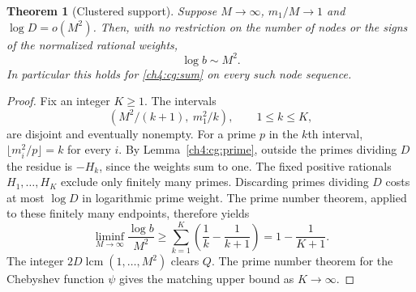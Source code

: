 \documentclass[11pt,a4paper,oneside,openany]{report}
\newtheorem{theorem}{Theorem}[section]
\theoremstyle{remark}\newtheorem{remark}[theorem]{Remark}
\numberwithin{equation}{section}
\begin{document}
\begin{theorem}[Clustered support]\label{ch4:cg:cluster}
Suppose $M\to\infty$, $m_1/M\to1$ and $\log D=o(M^2)$.
Then, with no restriction on the number of nodes or the signs of
the normalized rational weights,
\[
                          \log b\sim M^2 .
\]
In particular this holds for \eqref{ch4:cg:sum} on every such node sequence.
\end{theorem}
\begin{proof}
Fix an integer $K\ge1$. The intervals
\[
           \left(M^2/(k+1),\ m_1^2/k\right),\qquad 1\le k\le K,
\]
are disjoint and eventually nonempty. For a prime $p$ in the $k$th
interval, $\lfloor m_i^2/p\rfloor=k$ for every $i$.
By Lemma~\ref{ch4:cg:prime}, outside the primes dividing $D$ the residue is
$-H_k$, since the weights sum to one. The fixed positive rationals
$H_1,\ldots,H_K$ exclude only finitely many primes. Discarding primes
dividing $D$ costs at most $\log D$ in logarithmic prime weight.
The prime number theorem, applied to these finitely many endpoints,
therefore yields
\[
 \liminf_{M\to\infty}\frac{\log b}{M^2}
 \ge\sum_{k=1}^K\left(\frac1k-\frac1{k+1}\right)
 =1-\frac1{K+1}.
\]
The integer $2D\operatorname{lcm}(1,\ldots,M^2)$ clears $Q$.
The prime number theorem for the Chebyshev function $\psi$ gives
the matching upper bound as $K\to\infty$.
\end{proof}
\end{document}
